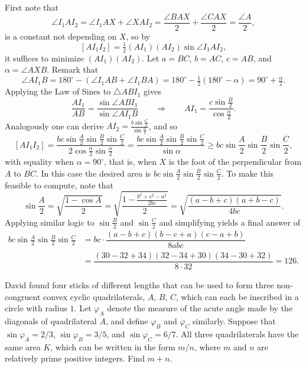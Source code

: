 \documentclass[11pt]{article}
\theoremstyle{definition}
\begin{document}
\begin{solution}[name={Solution by David Altizio}]
	First note that\[\angle I_1AI_2 = \angle I_1AX + \angle XAI_2 = \frac{\angle BAX}2 + \frac{\angle CAX}2 = \frac{\angle A}2,\]is a constant not depending on $X$, so by $$[AI_1I_2] = \tfrac12(AI_1)(AI_2)\sin\angle I_1AI_2,$$ it suffices to minimize $(AI_1)(AI_2)$. Let $a = BC$, $b = AC$, $c = AB$, and $\alpha = \angle AXB$. Remark that\[\angle AI_1B = 180^\circ - (\angle I_1AB + \angle I_1BA) = 180^\circ - \tfrac12(180^\circ - \alpha) = 90^\circ + \tfrac\alpha 2.\]Applying the Law of Sines to $\triangle ABI_1$ gives\[\frac{AI_1}{AB} = \frac{\sin\angle ABI_1}{\sin\angle AI_1B}\qquad\Rightarrow\qquad AI_1 = \frac{c\sin\frac B2}{\cos\frac\alpha 2}.\]Analogously one can derive $AI_2 = \tfrac{b\sin\frac C2}{\sin\frac\alpha 2}$, and so\[[AI_1I_2] = \frac{bc\sin\frac A2 \sin\frac B2\sin\frac C2}{2\cos\frac\alpha 2\sin\frac\alpha 2} = \frac{bc\sin\frac A2 \sin\frac B2\sin\frac C2}{\sin\alpha}\geq bc\sin\frac A2 \sin\frac B2\sin\frac C2,\]with equality when $\alpha = 90^\circ$, that is, when $X$ is the foot of the perpendicular from $A$ to $\overline{BC}$. In this case the desired area is $bc\sin\tfrac A2\sin\tfrac B2\sin\tfrac C2$. To make this feasible to compute, note that\[\sin\frac A2=\sqrt{\frac{1-\cos A}2}=\sqrt{\frac{1-\frac{b^2+c^2-a^2}{2bc}}2} = \sqrt{\dfrac{(a-b+c)(a+b-c)}{4bc}}.\]Applying similar logic to $\sin \tfrac B2$ and $\sin\tfrac C2$ and simplifying yields a final answer of
	\begin{align*}
		bc\sin\frac A2\sin\frac B2\sin\frac C2&=bc\cdot\dfrac{(a-b+c)(b-c+a)(c-a+b)}{8abc}\\&=\dfrac{(30-32+34)(32-34+30)(34-30+32)}{8\cdot 32}=\boxed{126}.
	\end{align*}
\end{solution}










\begin{question}[name={2018 AIME I, \href{https://artofproblemsolving.com/community/c4p9995439}{Problem 15}}]
	David found four sticks of different lengths that can be used to form three non-congruent convex cyclic quadrilaterals, \(A\), \(B\), \(C\), which can each be inscribed in a circle with radius \(1\). Let \(\varphi_A\) denote the measure of the acute angle made by the diagonals of quadrilateral \(A\), and define \(\varphi_B\) and \(\varphi_C\) similarly. Suppose that \(\sin\varphi_A={2}/{3}\), \(\sin\varphi_B={3}/{5}\), and \(\sin\varphi_C={6}/{7}\). All three quadrilaterals have the same area \(K\), which can be written in the form \({m}/{n}\), where \(m\) and \(n\) are relatively prime positive integers. Find \(m+n\).
\end{question}
\end{document}

